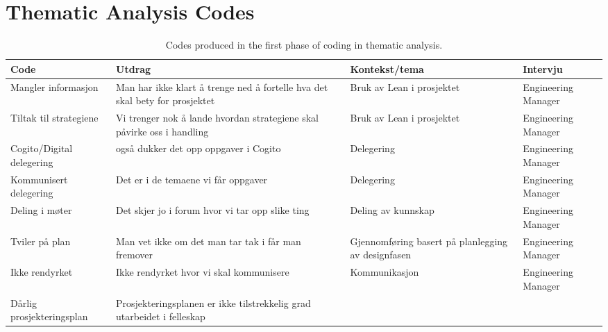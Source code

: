 
\chapter{Thematic Analysis Codes} \label{apx:codes}

\begin{landscape}
    \begin{longtable}{p{0.25\textheight}p{0.5\textheight}p{0.25\textheight}p{0.25\textheight}}
    \caption{Codes produced in the first phase of coding in thematic analysis.}
    \label{tab:codes}\\
    \toprule
    \textbf{Code} &
      \textbf{Utdrag} &
      \textbf{Kontekst/tema} &
      \textbf{Intervju} \\* \midrule
    \endhead
    \bottomrule
    \endfoot
    \endlastfoot
    Mangler informasjon &
      Man har ikke klart å trenge ned å fortelle hva det skal bety for prosjektet &
      Bruk av Lean i prosjektet &
      Engineering Manager \\
    Tiltak til strategiene &
      Vi trenger nok å lande hvordan strategiene skal påvirke oss i handling &
      Bruk av Lean i prosjektet &
      Engineering Manager \\
    Cogito/Digital delegering &
      også dukker det opp oppgaver i Cogito &
      Delegering &
      Engineering Manager \\
    Kommunisert delegering &
      Det er i de temaene vi får oppgaver &
      Delegering &
      Engineering Manager \\
    Deling i møter &
      Det skjer jo i forum hvor vi tar opp slike ting &
      Deling av kunnskap &
      Engineering Manager \\
    Tviler på plan &
      Man vet ikke om det man tar tak i får man fremover &
      Gjennomføring basert på planlegging av designfasen &
      Engineering Manager \\
    Ikke rendyrket &
      Ikke rendyrket hvor vi skal kommunisere &
      Kommunikasjon &
      Engineering Manager \\
    Dårlig prosjekteringsplan &
      Prosjekteringsplanen er ikke tilstrekkelig grad utarbeidet i felleskap &

\end{longtable}
\end{landscape}
